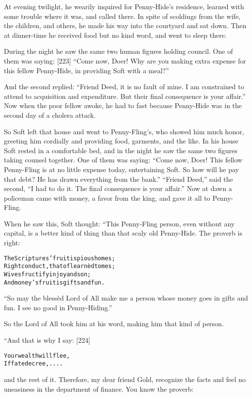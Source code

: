 \documentclass{article}
\renewenvironment{verbatim}{\begin{alltt}\normalfont\begin{centering}}{\end{centering}\end{alltt}}
\begin{document}
At evening twilight, he wearily inquired for Penny-Hide's
residence, learned with some trouble where it was, and called
there. In spite of scoldings from the wife, the children, and
others, he made his way into the courtyard and sat down. Then at
dinner-time he received food but no kind word, and went to sleep
there.

During the night he saw the same two human figures holding council.
One of them was saying: [223]
``Come now, Doer! Why are you making extra expense for this fellow Penny-Hide, in providing Soft with a meal?''

And the second replied:
``Friend Deed, it is no fault of mine. I am constrained to attend to acquisition and expenditure. But their final consequence is your affair.''
Now when the poor fellow awoke, he had to fast because Penny-Hide
was in the second day of a cholera attack.

So Soft left that house and went to Penny-Fling's, who showed him
much honor, greeting him cordially and providing food, garments,
and the like. In his house Soft rested in a comfortable bed, and in
the night he saw the same two figures taking counsel together. One
of them was saying:
``Come now, Doer! This fellow Penny-Fling is at no little expense today, entertaining Soft. So how will he pay that debt? He has drawn everything from the bank.''
``Friend Deed,'' said the second,
``I had to do it. The final consequence is your affair.'' Now at
dawn a policeman came with money, a favor from the king, and gave
it all to Penny-Fling.

When he saw this, Soft thought: “This Penny-Fling person, even
without any capital, is a better kind of thing than that scaly old
Penny-Hide. The proverb is right:

\begin{verbatim}
The Scriptures' fruit is pious homes;
Right conduct, that of learnèd tomes;
Wives fructify in joy and son;
And money's fruit is gifts and fun.
\end{verbatim}
``So may the blessèd Lord of All make me a person whose money goes in gifts and fun. I see no good in Penny-Hiding.''

So the Lord of All took him at his word, making him that kind of
person.

“And that is why I say: [224]

\begin{verbatim}
Your wealth will flee,
If fate decree, ....
\end{verbatim}
and the rest of it. Therefore, my dear friend Gold, recognize the
facts and feel no uneasiness in the department of finance. You know
the proverb:
\end{document}

